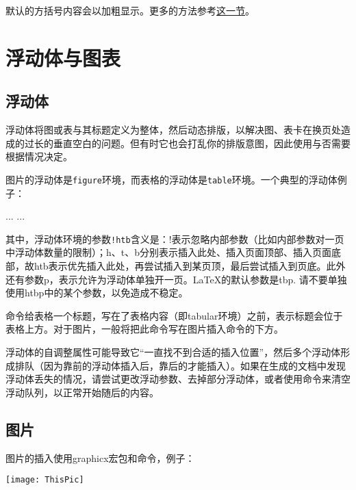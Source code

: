 {默认的方括号内容会以加粗显示。更多的方法参考\hyperref[sec:list]{这一节}。

\section{浮动体与图表}
\label{sec:float}

\subsection{浮动体}
浮动体将图或表与其标题定义为整体，然后动态排版，以解决图、表卡在换页处造成的过长的垂直空白的问题。但有时它也会打乱你的排版意图，因此使用与否需要根据情况决定。

图片的浮动体是\texttt{figure}环境，而表格的浮动体是\texttt{table}环境。一个典型的浮动体例子：
\begin{latex}{}
\begin{table}[!htb]
  \begin{center}
    \label{table-name}
    \caption{table-cap}
    \begin{tabular}{...}
      ...
    \end{tabular}
  \end{center}
\end{table}
\end{latex}

其中，浮动体环境的参数\verb|!htb|含义是：!表示忽略内部参数（比如内部参数对一页中浮动体数量的限制）；h、t、b分别表示插入此处、插入页面顶部、插入页面底部，故htb表示优先插入此处，再尝试插入到某页顶，最后尝试插入到页底。此外还有参数p，表示允许为浮动体单独开一页。\LaTeX 的默认参数是tbp. 请不要单独使用htbp中的某个参数，以免造成不稳定。

\latexline{\\caption}命令给表格一个标题，写在了表格内容（即tabular环境）之前，表示标题会位于表格上方。对于图片，一般将把此命令写在图片插入命令的下方。\dpar

浮动体的自调整属性可能导致它“一直找不到合适的插入位置”，然后多个浮动体形成排队（因为靠前的浮动体插入后，靠后的才能插入）。如果在生成的文档中发现浮动体丢失的情况，请尝试更改浮动参数、去掉部分浮动体，或者使用\latexline{\\clearpage}命令来清空浮动队列，以正常开始随后的内容。

\subsection{图片}
图片的插入使用graphicx宏包和命令，例子：
\begin{latex}{}
\begin{center}
  \texttt{[image: ThisPic]}
\end{center}
\end{latex}

}
